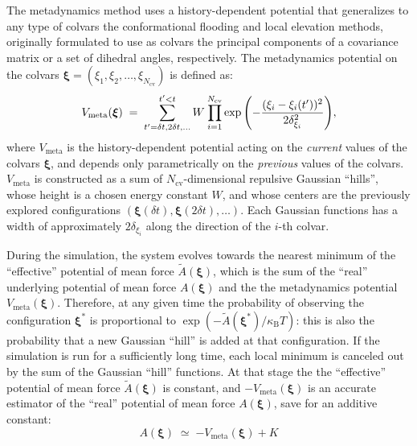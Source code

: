 \label{sec:colvarbias_meta}

The metadynamics method uses a history-dependent potential \cite{Laio2002} that generalizes to any type of colvars the conformational flooding \cite{Grubmuller1995} and local elevation \cite{Huber1994} methods, originally formulated to use as colvars the principal components of a covariance matrix or a set of dihedral angles, respectively.
The metadynamics potential on the colvars $\bm{\xi} = (\xi_{1}, \xi_{2}, \ldots, \xi_{N_{\mathrm{cv}}})$ is defined as:
\begin{equation}
  \label{eq:colvars_meta_pot}
  V_{\mathrm{meta}}({\mbox{\boldmath{$\xi$}}}) \; = \; {
    \sum_{t' = \delta{}t, \\ 2\delta{}t, \\ \ldots}^{t'<t} W \: {
      \prod_{i = 1}^{N_{\mathrm{cv}}}
      \exp\left(-\frac{(\xi_{i}-\xi_{i}(t'))^{2}}{2\delta_{\xi_{i}}^{2}}\right)
    }
  }\mathrm{,}
\end{equation}
where $V_{\mathrm{meta}}$ is the history-dependent potential acting on the \emph{current} values of the colvars $\bm{\xi}$, and depends only parametrically on the \emph{previous} values of the colvars.
$V_{\mathrm{meta}}$ is constructed as a sum of $N_{\mathrm{cv}}$-dimensional repulsive Gaussian ``hills'', whose height is a chosen energy constant $W$, and whose centers are the previously explored configurations $\left(\bm{\xi}(\delta{}t), \bm{\xi}(2\delta{}t), \ldots\right)$.
Each Gaussian functions has a width of approximately $2\delta_{\xi_{i}}$ along the direction of the $i$-th colvar.

During the simulation, the system evolves towards the nearest minimum of the ``effective'' potential of mean force $\tilde{A}(\bm{\xi})$, which is the sum of the ``real'' underlying potential of mean force $A(\bm{\xi})$ and the the metadynamics potential $V_{\mathrm{meta}}(\bm{\xi})$.
Therefore, at any given time the probability of observing the configuration $\bm{\xi^{*}}$ is proportional to $\exp\left(-\tilde{A}(\bm{\xi^{*}})/\kappa_{\mathrm{B}}T\right)$: this is also the probability that a new Gaussian ``hill'' is added at that configuration.
If the simulation is run for a sufficiently long time, each local minimum is canceled out by the sum of the Gaussian ``hill'' functions.
At that stage the the ``effective'' potential of mean force $\tilde{A}(\bm{\xi})$ is constant, and $-V_{\mathrm{meta}}(\bm{\xi})$ is an accurate estimator of the ``real'' potential of mean force $A(\bm{\xi})$, save for an additive constant:
\begin{equation}
  \label{eq:colvars_meta_fes}
  A(\bm{\xi}) \; \simeq \; {
    -V_{\mathrm{meta}}(\bm{\xi}) + K
  }
\end{equation}

